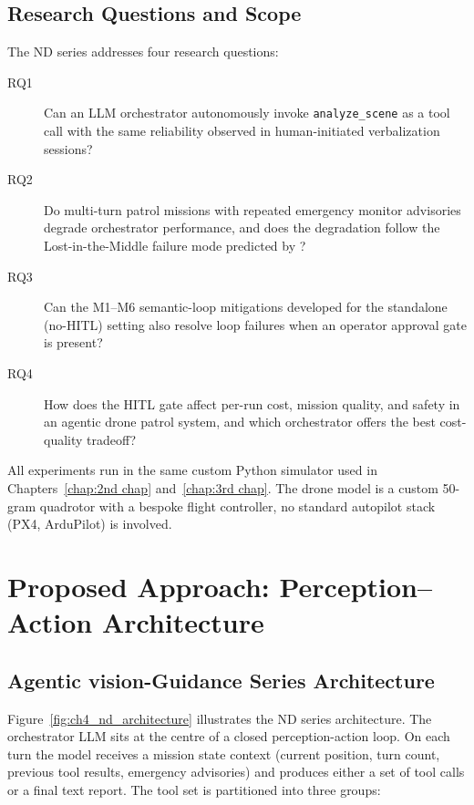 \subsection{Research Questions and Scope}
\label{sec:ch4_problem_rq}

The ND series addresses four research questions:

\begin{description}
  \item[RQ1] Can an LLM orchestrator autonomously invoke \texttt{analyze\_scene} as a tool call with the same reliability observed in human-initiated verbalization sessions?

  \item[RQ2] Do multi-turn patrol missions with repeated emergency monitor advisories degrade orchestrator performance, and does the degradation follow the Lost-in-the-Middle failure mode predicted by \citet{liu2023lostinthemiddle}?

  \item[RQ3] Can the M1--M6 semantic-loop mitigations developed for the standalone (no-HITL) setting also resolve loop failures when an operator approval gate is present?

  \item[RQ4] How does the HITL gate affect per-run cost, mission quality, and safety in an agentic drone patrol system, and which orchestrator offers the best cost-quality tradeoff?
\end{description}

All experiments run in the same custom Python simulator used in Chapters~\ref{chap:2nd chap}
and~\ref{chap:3rd chap}.  
The drone model is a custom 50-gram quadrotor with a bespoke flight controller, no standard autopilot stack (PX4, ArduPilot) is involved.

\section{Proposed Approach: Perception--Action Architecture}
\label{sec:ch4_proposed}

\subsection{Agentic vision-Guidance Series Architecture}
\label{sec:ch4_proposed_arch}

Figure~\ref{fig:ch4_nd_architecture} illustrates the ND series architecture.  
The orchestrator LLM sits at the centre of a closed perception-action loop. 
On each turn the model receives a mission state context (current position, turn count, previous tool
results, emergency advisories) and produces either a set of tool calls or a final text report.
The tool set is partitioned into three groups:

